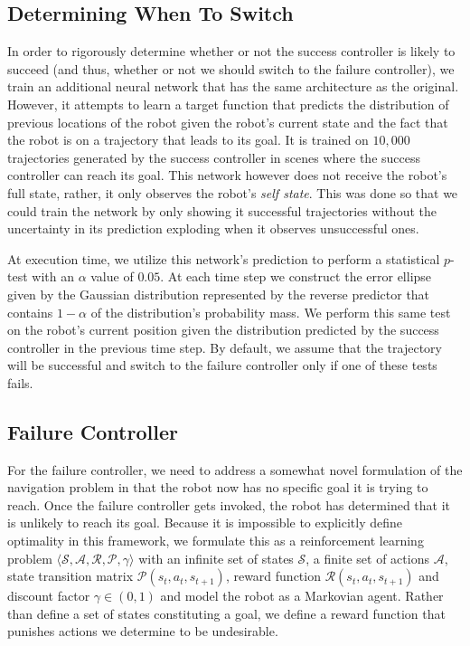 \documentclass[letterpaper, 10 pt, conference]{ieeeconf}  %
\begin{document}
	\subsection{Determining When To Switch}
		In order to rigorously determine whether or not the success controller is likely to succeed (and thus, whether or not we should switch to the failure controller), we train an additional neural network that has the same architecture as the original. However, it attempts to learn a target function that predicts the distribution of previous locations of the robot given the robot's current state and the fact that the robot is on a trajectory that leads to its goal. It is trained on $10,000$ trajectories generated by the success controller in scenes where the success controller can reach its goal. This network however does not receive the robot's full state, rather, it only observes the robot's \textit{self state}. This was done so that we could train the network by only showing it successful trajectories without the uncertainty in its prediction exploding when it observes unsuccessful ones. 
		
		At execution time, we utilize this network's prediction to perform a statistical $p$-test with an $\alpha$ value of $0.05$. At each time step we construct the error ellipse given by the Gaussian distribution represented by the reverse predictor that contains $1-\alpha$ of the distribution's probability mass. We perform this same test on the robot's current position given the distribution predicted by the success controller in the previous time step. By default, we assume that the trajectory will be successful and switch to the failure controller only if one of these tests fails.
	
	\subsection{Failure Controller}
		For the failure controller, we need to address a somewhat novel formulation of the navigation problem in that the robot now has no specific goal it is trying to reach. Once the failure controller gets invoked, the robot has determined that it is unlikely to reach its goal. Because it is impossible to explicitly define optimality in this framework, we formulate this as a reinforcement learning problem $\langle\mathcal{S}, \mathcal{A}, \mathcal{R}, \mathcal{P}, \gamma\rangle$ with an infinite set of states $\mathcal{S}$, a finite set of actions $\mathcal{A}$, state transition matrix $\mathcal{P}(s_t, a_t, s_{t+1})$, reward function $\mathcal{R}(s_t, a_t, s_{t+1})$ and discount factor $\gamma \in (0, 1)$ \cite{suttonandbarto} and model the robot as a Markovian agent. Rather than define a set of states constituting a goal, we define a reward function that punishes actions we determine to be undesirable. 
		
\end{document}
